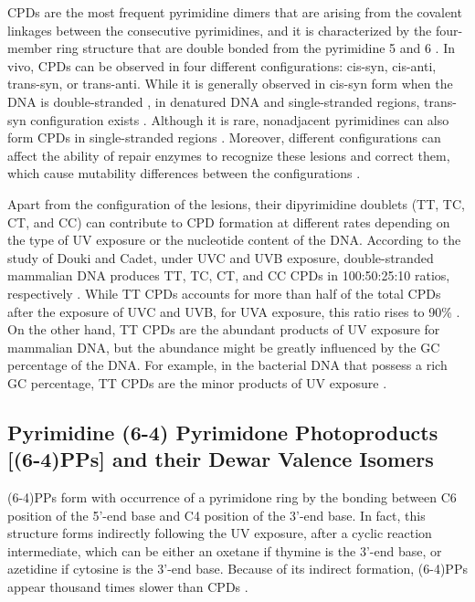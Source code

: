 CPDs are the most frequent pyrimidine dimers that are arising from the covalent linkages between the consecutive pyrimidines, and it is characterized by the four-member ring structure that are double bonded from the pyrimidine 5 and 6 \citep{whitmore2001effect}. In vivo, CPDs can be observed in four different configurations: cis-syn, cis-anti, trans-syn, or trans-anti. \citep{khattak1972photochemical} While it is generally observed in cis-syn form when the DNA is double-stranded \citep{wacker1964organic}, in denatured DNA and single-stranded regions, trans-syn configuration exists \citep{taylor1988synthesis}. Although it is rare, nonadjacent pyrimidines can also form CPDs in single-stranded regions \citep{nguyen1988ultraviolet}. Moreover, different configurations can affect the ability of repair enzymes to recognize these lesions and correct them, which cause mutability differences between the configurations \citep{friedberg2005dna}. 

Apart from the configuration of the lesions, their dipyrimidine doublets (TT, TC, CT, and CC) can contribute to CPD formation at different rates depending on the type of UV exposure or the nucleotide content of the DNA. According to the study of Douki and Cadet, under UVC and UVB exposure, double-stranded mammalian DNA produces TT, TC, CT, and CC CPDs in 100:50:25:10 ratios, respectively \citep{douki2001individual}. While TT CPDs accounts for more than half of the total CPDs after the exposure of UVC and UVB, for UVA exposure, this ratio rises to 90\% \citep{mouret2010uva}. On the other hand, TT CPDs are the abundant products of UV exposure for mammalian DNA, but the abundance might be greatly influenced by the GC percentage of the DNA. For example, in the bacterial DNA that possess a rich GC percentage, TT CPDs are the minor products of UV exposure \citep{patrick1977studies}.

\subsection{Pyrimidine (6-4) Pyrimidone Photoproducts [(6-4)PPs] and their Dewar Valence Isomers}

(6-4)PPs form with occurrence of a pyrimidone ring by the bonding between C6 position of the 5’-end base and C4 position of the 3’-end base. In fact, this structure forms indirectly following the UV exposure, after a cyclic reaction intermediate, which can be either an oxetane if thymine is the 3’-end base, or azetidine if cytosine is the 3’-end base. Because of its indirect formation, (6-4)PPs appear thousand times slower than CPDs \citep{schreier2007thymine}. 

